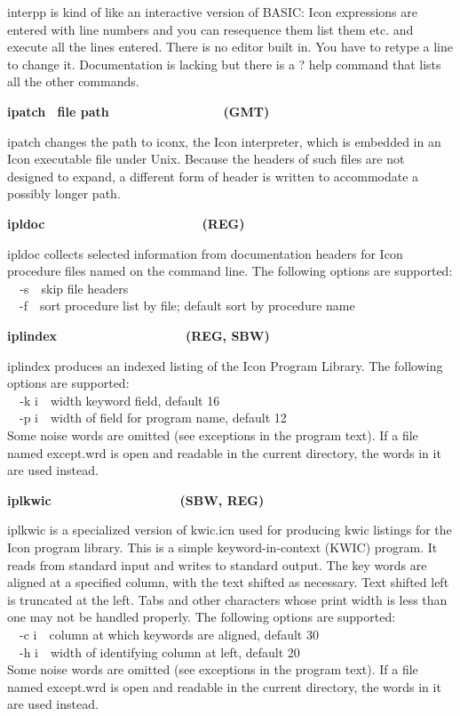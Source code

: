 \textsf{interpp} is kind of like an interactive version of BASIC: Icon
expressions are entered with line numbers and you can resequence them
list them etc. and execute all the lines entered. There is no editor
built in. You have to retype a line to change it. Documentation is
lacking but there is a {\textquotedbl}?{\textquotedbl} help command
that lists all the other commands. 

{\sffamily\bfseries
ipatch \ \textrm{\textmd{file
path\ \ \ \ \ \ \ \ \ \ \ \ \ \ \ \ }}(GMT)}

\textsf{ipatch} changes the path to iconx, the Icon interpreter, which
is embedded in an Icon executable file under Unix. Because the headers
of such files are not designed to expand, a different form of header is
written to accommodate a possibly longer path.

{\sffamily\bfseries
ipldoc\ \ \ \ \ \ \ \ \ \ \ \ \ \ \ \ \ \ \ \ \ \ (REG)}

\textsf{ipldoc} collects selected information from documentation headers
for Icon procedure files named on the command line. The following
options are supported:\\
\texttt{\ \ }\textsf{{}-s}\ \ skip file headers\\
\ \ \textsf{{}-f}\ \ sort procedure list by file; default sort by
procedure name

{\sffamily\bfseries
iplindex\ \ \ \ \ \ \ \ \ \ \ \ \ \ \ \ \ \ (REG, SBW)}

\textsf{iplindex} produces an indexed listing of the Icon Program
Library. The following options are supported:\\
\texttt{\ \ }\textsf{{}-k i}\ \ width keyword field, default 16\\
\ \ \textsf{{}-p i}\ \ width of field for program name, default
12\\
Some noise words are omitted (see
{\textquotedbl}exceptions{\textquotedbl} in the program text). If a
file named except.wrd is open and readable in the current directory,
the words in it are used instead. 

{\sffamily\bfseries
iplkwic\ \ \ \ \ \ \ \ \ \ \ \ \ \ \ \ \ \ (SBW, REG)}

\textsf{iplkwic} is a specialized version of \textsf{kwic.icn} used for
producing kwic listings for the Icon program library. This is a simple
keyword-in-context (KWIC) program. It reads from standard
input and writes to standard output. The
{\textquotedbl}key{\textquotedbl} words are aligned at a specified
column, with the text shifted as necessary. Text shifted left is
truncated at the left. Tabs and other characters whose
{\textquotedbl}print width{\textquotedbl} is less than one may not be
handled properly. The following options are supported:\\
\ \ \textsf{{}-c i}\ \ column at which keywords are aligned, default
30\\
\ \ \textsf{{}-h i}\ \ width of identifying column at left, default
20\\
Some noise words are omitted (see
{\textquotedbl}exceptions{\textquotedbl} in the program text). If a
file named except.wrd is open and readable in the current directory,
the words in it are used instead.

